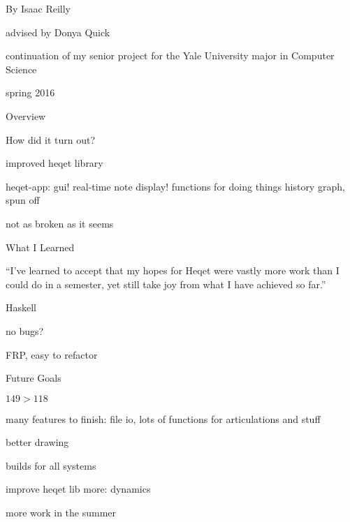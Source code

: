 \documentclass{article}
\begin{document}
\pagestyle{empty}
\begin{center}
\vspace{3cm}

\vspace{2cm}
{\Large By Isaac Reilly}

\vspace{0.15cm}
{\large advised by Donya Quick}

\vspace{0.1cm}
{continuation of my senior project for the Yale University major in Computer Science}

\vspace{13cm}

{\small spring 2016}

\end{center}

\pagebreak
\pagestyle{plain}


\begin{section}{Overview}



\end{section}
\begin{section}{How did it turn out?}

improved heqet library

heqet-app:
	gui!
	real-time note display!
	functions for doing things
	history graph, spun off
	
	not as broken as it seems

\end{section}
\begin{section}{What I Learned}

``I've learned to accept that my hopes for Heqet were vastly more work than I could do in a semester, yet still take joy from what I have achieved so far.''

\end{section}
\begin{section}{Haskell}

no bugs?

FRP, easy to refactor

\end{section}

\begin{section}{Future Goals}

$149 > 118$

many features to finish: file io, lots of functions for articulations and stuff

better drawing

builds for all systems

improve heqet lib more: dynamics

more work in the summer

\end{section}
\end{document}
